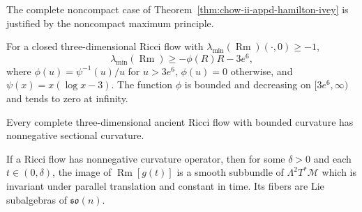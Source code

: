 \begin{remark}
\label{rem:chow-ii-appd-hamilton-ivey-noncompact}

The complete noncompact case of Theorem~\ref{thm:chow-ii-appd-hamilton-ivey}
is justified by the noncompact maximum principle.
\end{remark}

\begin{corollary}
\label{cor:chow-ii-appd-almost-nonnegative-curvature}


For a closed three-dimensional Ricci flow with
$\lambda_{\min}(\operatorname{Rm})(\cdot,0)\geq-1$,
\[
 \lambda_{\min}(\operatorname{Rm})\geq-\phi(R)R-3e^6,
\]
where $\phi(u)=\psi^{-1}(u)/u$ for $u>3e^6$, $\phi(u)=0$ otherwise, and
$\psi(x)=x(\log x-3)$. The function $\phi$ is bounded and decreasing on
$[3e^6,\infty)$ and tends to zero at infinity.
\end{corollary}

\begin{lemma}
\label{lem:chow-ii-appd-ancient-three-dimensional-nonnegative}


Every complete three-dimensional ancient Ricci flow with bounded curvature
has nonnegative sectional curvature.
\end{lemma}

\begin{theorem}
\label{thm:chow-ii-appd-curvature-operator-strong-maximum-principle}

If a Ricci flow has nonnegative curvature operator, then for some $\delta>0$
and each $t\in(0,\delta)$, the image of $\operatorname{Rm}[g(t)]$ is a smooth
subbundle of $\Lambda^2T^*\mathcal M$ which is invariant under parallel
translation and constant in time. Its fibers are Lie subalgebras of
$\mathfrak{so}(n)$.
\end{theorem}

